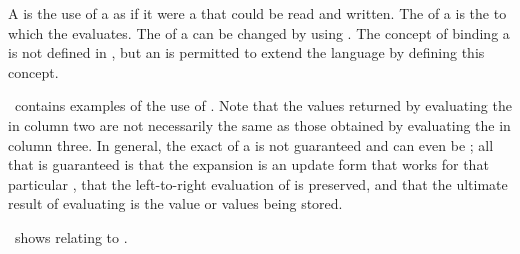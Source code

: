 


A  is the use of a  
as if it were a  that could be read and written.
The  of a  is 
the  to which the  evaluates.
The  of a  can be
changed by using .  The concept of binding a
 is not defined in \clisp, but an
 is permitted to extend the language by 
defining this concept.

\Thenextfigure\ contains examples of the use of .
Note that the values returned by evaluating the  in column two 
are not necessarily the same as those obtained by evaluating the 
 in column three.
In general, the exact  of a   is not guaranteed 
and can even be ;
all that is guaranteed is 
 that the expansion is an update form that works
   for that particular ,
 that the left-to-right evaluation of  is preserved, 
and
 that the ultimate result of evaluating  is the value
  or values being stored.


\Thenextfigure\ shows  relating to
.




